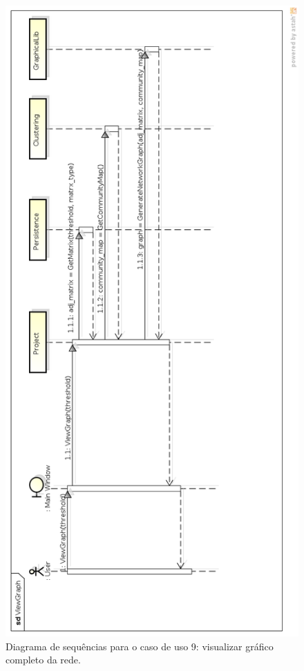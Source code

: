 \begin{figure}
\centering
\includegraphics[scale=0.41]{view-graph}
\caption{Diagrama de sequências para o caso de uso 9: visualizar gráfico completo da rede.}
\label{fig:view-graph}
\end{figure}

